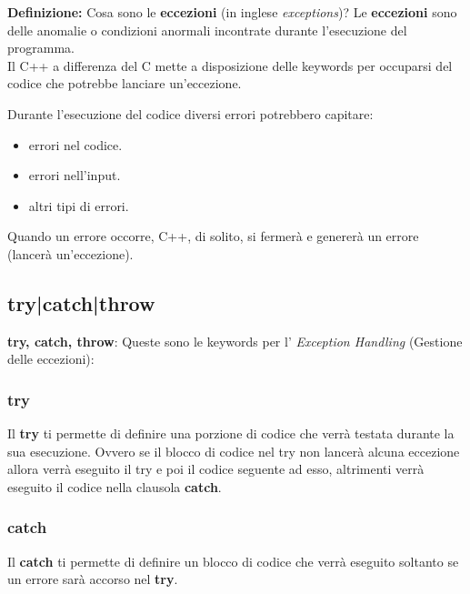 \textsf{\small \textbf{Definizione: } Cosa sono le \textbf{eccezioni} (in inglese \emph{exceptions})? Le \textbf{eccezioni} sono delle anomalie o condizioni anormali incontrate durante l'esecuzione del programma.} \\

\textsf{\small Il C++ a differenza del C mette a disposizione delle keywords per occuparsi del codice che potrebbe lanciare un'eccezione.} \break

\textsf{\small Durante l'esecuzione del codice diversi errori potrebbero capitare: } \\

\begin{itemize}
	\item \textsf{\small errori nel codice.}
	\item \textsf{\small errori nell'input.}
	\item \textsf{\small altri tipi di errori.}
\end{itemize}

\textsf{\small Quando un errore occorre, C++, di solito, si fermerà e genererà un errore (lancerà un'eccezione).} \\

\subsection{try|catch|throw}

\textsf{\small \textbf{try, catch, throw}: Queste sono le keywords per l' \emph{Exception Handling} (Gestione delle eccezioni):}

\subsubsection{try}

\textsf{\small Il \textbf{try} ti permette di definire una porzione di codice che verrà testata durante la sua esecuzione. Ovvero se il blocco di codice nel try non lancerà alcuna eccezione allora verrà eseguito il try e poi il codice seguente ad esso, altrimenti verrà eseguito il codice nella clausola \textbf{catch}.} \\

\subsubsection{catch}

\textsf{\small Il \textbf{catch} ti permette di definire un blocco di codice che verrà eseguito soltanto se un errore sarà accorso nel \textbf{try}.} \\

